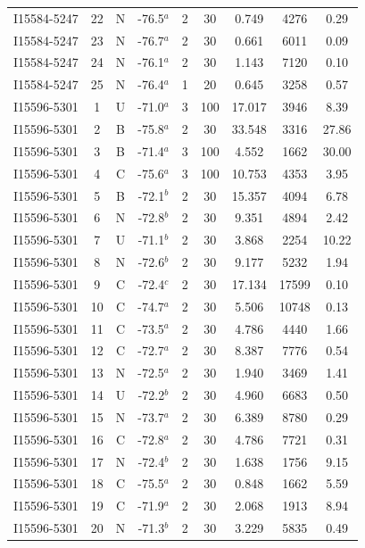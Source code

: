 \begin{table}
\begin{tabular}{ccccccccc}
I15584-5247 & 22 & N & -76.5$^{a}$ & 2 & 30 & 0.749 & 4276 & 0.29 \\
I15584-5247 & 23 & N & -76.7$^{a}$ & 2 & 30 & 0.661 & 6011 & 0.09 \\
I15584-5247 & 24 & N & -76.1$^{a}$ & 2 & 30 & 1.143 & 7120 & 0.10 \\
I15584-5247 & 25 & N & -76.4$^{a}$ & 1 & 20 & 0.645 & 3258 & 0.57 \\
I15596-5301 & 1 & U & -71.0$^{a}$ & 3 & 100 & 17.017 & 3946 & 8.39 \\
I15596-5301 & 2 & B & -75.8$^{a}$ & 2 & 30 & 33.548 & 3316 & 27.86 \\
I15596-5301 & 3 & B & -71.4$^{a}$ & 3 & 100 & 4.552 & 1662 & 30.00 \\
I15596-5301 & 4 & C & -75.6$^{a}$ & 3 & 100 & 10.753 & 4353 & 3.95 \\
I15596-5301 & 5 & B & -72.1$^{b}$ & 2 & 30 & 15.357 & 4094 & 6.78 \\
I15596-5301 & 6 & N & -72.8$^{b}$ & 2 & 30 & 9.351 & 4894 & 2.42 \\
I15596-5301 & 7 & U & -71.1$^{b}$ & 2 & 30 & 3.868 & 2254 & 10.22 \\
I15596-5301 & 8 & N & -72.6$^{b}$ & 2 & 30 & 9.177 & 5232 & 1.94 \\
I15596-5301 & 9 & C & -72.4$^{c}$ & 2 & 30 & 17.134 & 17599 & 0.10 \\
I15596-5301 & 10 & C & -74.7$^{a}$ & 2 & 30 & 5.506 & 10748 & 0.13 \\
I15596-5301 & 11 & C & -73.5$^{a}$ & 2 & 30 & 4.786 & 4440 & 1.66 \\
I15596-5301 & 12 & C & -72.7$^{a}$ & 2 & 30 & 8.387 & 7776 & 0.54 \\
I15596-5301 & 13 & N & -72.5$^{a}$ & 2 & 30 & 1.940 & 3469 & 1.41 \\
I15596-5301 & 14 & U & -72.2$^{b}$ & 2 & 30 & 4.960 & 6683 & 0.50 \\
I15596-5301 & 15 & N & -73.7$^{a}$ & 2 & 30 & 6.389 & 8780 & 0.29 \\
I15596-5301 & 16 & C & -72.8$^{a}$ & 2 & 30 & 4.786 & 7721 & 0.31 \\
I15596-5301 & 17 & N & -72.4$^{b}$ & 2 & 30 & 1.638 & 1756 & 9.15 \\
I15596-5301 & 18 & C & -75.5$^{a}$ & 2 & 30 & 0.848 & 1662 & 5.59 \\
I15596-5301 & 19 & C & -71.9$^{a}$ & 2 & 30 & 2.068 & 1913 & 8.94 \\
I15596-5301 & 20 & N & -71.3$^{b}$ & 2 & 30 & 3.229 & 5835 & 0.49 \\

\end{tabular}
\end{table}
